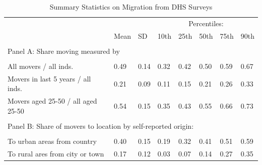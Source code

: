 \documentclass[12pt]{article}
\begin{document}
\begin{table}[!htb]
\begin{center}
\caption{Summary Statistics on Migration from DHS Surveys}
\label{TAB_migration}
{\small
\begin{tabularx}{\textwidth}{lXXXXXXX}
\midrule
 &      &            & \multicolumn{5}{c}{Percentiles:} \\ \cmidrule{4-8}
 & Mean & SD  & 10th    & 25th    & 50th & 75th & 90th \\
\midrule
\\
\multicolumn{8}{l}{Panel A: Share moving measured by } \\ \\
All movers / all inds. &     0.49&     0.14&     0.32&     0.42&     0.50&     0.59&     0.67\\
Movers in last 5 years / all inds. &     0.21&     0.09&     0.11&     0.15&     0.21&     0.26&     0.33\\
Movers aged 25-50 / all aged 25-50 &     0.54&     0.15&     0.35&     0.43&     0.55&     0.66&     0.73\\
\\
\multicolumn{8}{l}{Panel B: Share of movers to location by self-reported origin:} \\ \\
To urban areas from country &     0.40&     0.15&     0.19&     0.32&     0.41&     0.51&     0.59\\
To rural ares from city or town &     0.17&     0.12&     0.03&     0.07&     0.14&     0.27&     0.35\\
\midrule
\end{tabularx}
}
\end{center}
\vspace{-.5cm}
\end{table}

\clearpage
\end{document}
